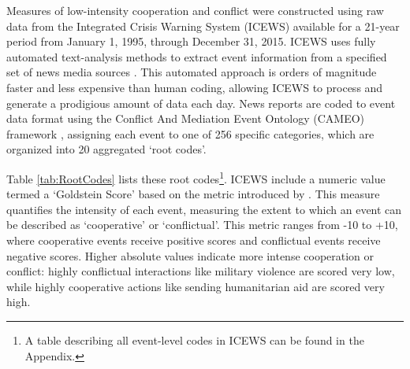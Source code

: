 \documentclass[10pt,]{article}
\begin{document}
Measures of low-intensity cooperation and conflict were constructed
using raw data from the Integrated Crisis Warning System (ICEWS)
available for a 21-year period from January 1, 1995, through December
31, 2015. ICEWS uses fully automated text-analysis methods to extract
event information from a specified set of news media sources
\citep{OBrien2010}. This automated approach is orders of magnitude
faster and less expensive than human coding, allowing ICEWS to process
and generate a prodigious amount of data each day. News reports are
coded to event data format using the Conflict And Mediation Event
Ontology (CAMEO) framework \citep{Gerner2009}, assigning each event to
one of 256 specific categories, which are organized into 20 aggregated
`root codes'.

Table \ref{tab:RootCodes} lists these root codes\footnote{A table
  describing all event-level codes in ICEWS can be found in the
  Appendix.}. ICEWS include a numeric value termed a `Goldstein Score'
based on the metric introduced by \citep[376]{Goldstein1996}. This
measure quantifies the intensity of each event, measuring the extent to
which an event can be described as `cooperative' or `conflictual'. This
metric ranges from -10 to +10, where cooperative events receive positive
scores and conflictual events receive negative scores. Higher absolute
values indicate more intense cooperation or conflict: highly conflictual
interactions like military violence are scored very low, while highly
cooperative actions like sending humanitarian aid are scored very high.

\newpage
\end{document}
